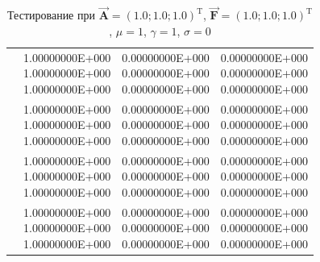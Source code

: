\begin{table}
	\caption{Тестирование при $\overrightarrow{\textbf{A}} = (1.0; 1.0; 1.0)^{\text{T}}$, $\overrightarrow{\textbf{F}} = (1.0; 1.0; 1.0)^{\text{T}}$, $\mu = 1$, $\gamma = 1$, $\sigma = 0$}
	\centering
	\small
	\begin{tabularx}{1.0\textwidth}{| >{\raggedright\arraybackslash}X | >{\raggedright\arraybackslash}X | >{\raggedright\arraybackslash}X |>{\raggedright\arraybackslash}X |}
		\hline
		\centering{Ребро} & \centering{Значение} & \centering{Абсолютная погрешность} & \centering{Относительная погрешность} \tabularnewline \hline
		
		
		\centering{($0.5; 0.5; 0.5$)} & \centering{1.00000000E+000 \\ 1.00000000E+000\\
			1.00000000E+000}& \centering{0.00000000E+000 \\ 0.00000000E+000 \\ 0.00000000E+000} & \centering{0.00000000E+000 \\ 0.00000000E+000 \\ 0.00000000E+000} \tabularnewline \hline
		
		\centering{($1.5; 0.5; 0.5$)} & \centering{1.00000000E+000 \\ 1.00000000E+000\\
			1.00000000E+000}& \centering{0.00000000E+000 \\ 0.00000000E+000 \\ 0.00000000E+000} & \centering{0.00000000E+000 \\ 0.00000000E+000 \\ 0.00000000E+000} \tabularnewline \hline
		
		\centering{($0.5; 1.5; 0.5$)} & \centering{1.00000000E+000 \\ 1.00000000E+000\\
			1.00000000E+000}& \centering{0.00000000E+000 \\ 0.00000000E+000 \\ 0.00000000E+000} & \centering{0.00000000E+000 \\ 0.00000000E+000 \\ 0.00000000E+000} \tabularnewline \hline
		
		\centering{($1.5; 1.5; 0.5$)} & \centering{1.00000000E+000 \\ 1.00000000E+000\\
			1.00000000E+000}& \centering{0.00000000E+000 \\ 0.00000000E+000 \\ 0.00000000E+000} & \centering{0.00000000E+000 \\ 0.00000000E+000 \\ 0.00000000E+000} \tabularnewline \hline
			

\end{tabularx}
\end{table}
